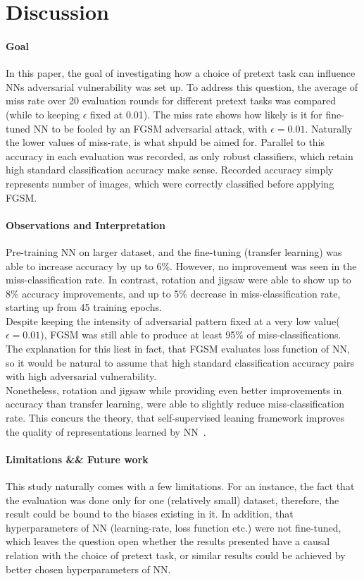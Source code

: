 \section{Discussion}

\paragraph{Goal}In this paper,
the goal of investigating how a choice of pretext task can influence NNs adversarial vulnerability was set up.
To address this question, the average of miss rate over 20 evaluation rounds for different pretext tasks was compared
(while to keeping $\epsilon$ fixed at 0.01).
The miss rate shows how likely is it for fine-tuned NN to be fooled by an FGSM adversarial attack,
with $\epsilon = 0.01$.
Naturally the lower values of miss-rate, is what shpuld be aimed for.
Parallel to this accuracy in each evaluation was recorded, as only robust classifiers, which retain high standard
classification accuracy make sense.
Recorded accuracy simply represents number of images, which were correctly classified before applying FGSM.


\paragraph{Observations and Interpretation}
Pre-training NN on larger dataset, and the fine-tuning (transfer learning) was able to increase accuracy by up to 6\%.
However, no improvement was seen in the miss-classification rate.
In contrast, rotation and jigsaw were able to show up to 8\% accuracy improvements,
and up to 5\% decrease in miss-classification rate, starting up from 45 training epochs.
\\
Despite keeping the intensity of adversarial pattern fixed at a very low value($\epsilon = 0.01$),
FGSM was still able to produce at least 95\% of miss-classifications.
The explanation for this liest in fact, that FGSM evaluates loss function of NN,
so it would be natural to assume that high standard classification accuracy pairs with high adversarial vulnerability.
\\
Nonetheless, rotation and jigsaw while providing even better improvements in accuracy than transfer learning,
were able to slightly reduce miss-classification rate.
This concurs the theory,
that self-supervised leaning framework improves the quality of representations
learned by NN~\cite{kolesnikov2019revisiting}.



\paragraph{Limitations \&\& Future work}
This study naturally comes with a few limitations.
For an instance, the fact that the evaluation was done only for one (relatively small) dataset,
therefore, the result could be bound to the biases existing in it.
In addition, that hyperparameters of NN (learning-rate, loss function etc.)
were not fine-tuned, which leaves the question open whether the
results presented have a causal relation with the choice of pretext task,
or similar results could be achieved by better chosen hyperparameters of NN.

